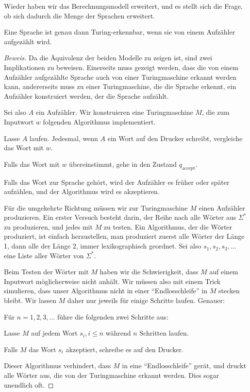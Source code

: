 Wieder haben wir das Berechnungsmodell erweitert, und es stellt sich
die Frage, ob sich dadurch die Menge der Sprachen erweitert.

\begin{satz}
%
Eine Sprache ist genau dann Turing-erkennbar, wenn sie
von einem Aufzähler aufgezählt wird.\end{satz}

\begin{proof}[Beweis]
Da die Äquivalenz der beiden Modelle zu zeigen ist, sind zwei Implikationen
zu beweisen. Einerseits muss gezeigt werden, dass die von einem
Aufzähler aufgezählte Sprache auch von einer Turingmaschine
erkannt werden kann, andererseits muss zu einer Turingmaschine, die
die Sprache erkennt, ein Aufzähler konstruiert werden, der die Sprache
aufzählt.

Sei also $A$ ein Aufzähler. Wir konstruieren eine Turingmaschine $M$, die
zum Inputwort $w$ folgenden Algorithmus implementiert.
\begin{compactenum}
\item Lasse $A$ laufen. Jedesmal, wenn $A$ ein Wort auf den Drucker schreibt,
vergleiche das Wort mit $w$.
\item Falls das Wort mit $w$ übereinstimmt, gehe in den Zustand
$q_{\text{accept}}$.
\end{compactenum}
Falls das Wort zur Sprache gehört, wird der Aufzähler es früher
oder später aufzählen, und der Algorithmus wird es akzeptieren.

Für die umgekehrte Richtung müssen wir zur Turingmaschine $M$
einen Aufzähler produzieren.
Ein erster Versuch besteht darin, der Reihe nach alle Wörter aus
$\Sigma^*$ zu produzieren, und jedes mit $M$ zu testen.
Ein Algorithmus, der die Wörter produziert, ist einfach herzustellen,
man produziert zuerst alle Wörter der Länge 1, dann alle der Länge 2,
immer lexikographisch geordnet.
Sei also $s_1,s_2,s_3,\dots$ eine Liste aller Wörter von $\Sigma^*$.

Beim Testen der Wörter mit $M$
haben wir die Schwierigkeit, dass $M$ auf einem Inputwort
möglicherweise nicht anhält. Wir müssen also mit einem Trick
simulieren, dass unser Algorithmus nicht in einer ``Endlosschleife''
in $M$ stecken bleibt. Wir lassen $M$ daher nur jeweils für einige
Schritte laufen.
Genauer:
\begin{compactenum}
\item Für $n=1,2,3,\dots$ führe die folgenden zwei Schritte aus:
\item Lasse $M$ auf jedem Wort $s_i, i \le n$ während $n$ Schritten
laufen.
\item Falls $M$ das Wort $s_i$ akzeptiert, schreibe es auf den Drucker.
\end{compactenum}
Dieser Algorithmus verhindert, dass $M$ in eine ``Endlosschleife''
gerät, und druckt alle Wörter aus, die von der Turingmaschine erkannt
werden. Dies sogar unendlich oft.
\end{proof}

